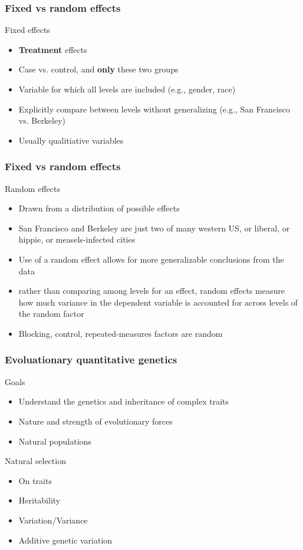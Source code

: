 \begin{frame}
\frametitle{Fixed vs random effects}
\begin{block}{Fixed effects}
\begin{itemize}
\item{\textbf{Treatment} effects}
\item{Case vs. control, and \textbf{only} these two groups}
\item{Variable for which all levels are included (e.g., gender, race)}
\item{Explicitly compare between levels without generalizing (e.g., San
Francisco vs. Berkeley)}
\item{Usually qualitiative variables}
\end{itemize}
\end{block}
\tiny
\citet{StroupFreund200203}
\end{frame}

\begin{frame}
\frametitle{Fixed vs random effects}
\begin{block}{Random effects}
\begin{itemize}
\item{Drawn from a distribution of possible effects}
\item{San Francisco and Berkeley are just two of many western US, 
or liberal, or hippie, or measels-infected cities}
\item{Use of a random effect allows for more generalizable conclusions 
from the data}
\item{rather than comparing among levels for an effect, random 
effects measure how much variance in the dependent variable is 
accounted for across levels of the random factor}
\item{Blocking, control, repeated-measures factors are random}
\end{itemize}
\end{block}
\tiny
\citet{StroupFreund200203}
\end{frame}

\begin{frame}
\frametitle{Evoluationary quantitative genetics \citep{Walsh:2008}}
\begin{block}{Goals}
\begin{itemize}
\item{Understand the genetics and inheritance of complex traits}
\item{Nature and strength of evolutionary forces}
\item{Natural populations}
\end{itemize}
\end{block}


\begin{block}{Natural selection}
\begin{itemize}
\item{On traits}
\item{Heritability}
\item{Variation/Variance}
\item{Additive genetic variation}
\end{itemize}
\end{block}
\end{frame}

